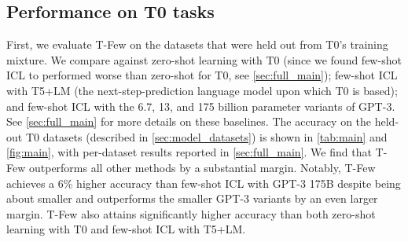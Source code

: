\documentclass{article}
\newcommand{\tfew}{{\fontfamily{lmtt}\selectfont T-Few}\xspace}
\begin{document}
\subsection{Performance on T0 tasks}

First, we evaluate \tfew on the datasets that were held out from T0's training mixture. We compare against zero-shot learning with T0 \cite{sanh2021multitask} (since we found few-shot ICL to performed worse than zero-shot for T0, see \cref{sec:full_main}); few-shot ICL with T5+LM \cite{lester2021power} (the next-step-prediction language model upon which T0 is based); and few-shot ICL with the 6.7, 13, and 175 billion parameter variants of GPT-3. See \cref{sec:full_main} for more details on these baselines.
The accuracy on the held-out T0 datasets (described in \cref{sec:model_datasets}) is shown in \cref{tab:main} and \cref{fig:main}, with per-dataset results reported in \cref{sec:full_main}.
We find that \tfew outperforms all other methods by a substantial margin.
Notably, \tfew achieves a 6\% higher accuracy than few-shot ICL with GPT-3 175B despite being about  smaller and outperforms the smaller GPT-3 variants by an even larger margin.
\tfew also attains significantly higher accuracy than both zero-shot learning with T0 and few-shot ICL with T5+LM.
\end{document}
